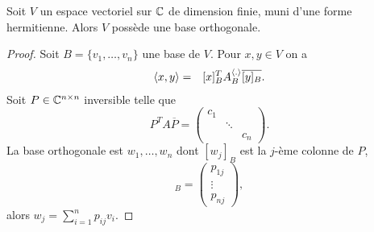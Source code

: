 \begin{theorem}
  \label{thr:11}
  Soit $V$ un espace vectoriel sur $\mathbb{C}$ de dimension finie, muni d'une forme  hermitienne. Alors $V$ possède une base orthogonale. 
\end{theorem}
\begin{proof}
  Soit $B = \{v_1,\dots,v_n\}$  une base de $V$. Pour $x,y \in V$ on a 
  \begin{eqnarray*}
    \langle {x,y} \rangle & = & [x]_B^T A_B^{\langle {.} \rangle} \overline{[y]_B}. 
  \end{eqnarray*}
  Soit $P \in \mathbb{C}^{n\times n} $ inversible telle que
  \begin{displaymath}
    P^T A \overline{P} =
    \begin{pmatrix}
      c_1\\
      & \ddots \\
      && c_n
    \end{pmatrix}. 
  \end{displaymath}
  La base orthogonale est $w_1,\dots,w_n$ dont $ [w_j]_B$ est  la $j$-ème colonne de $P$, 
  \begin{displaymath}
     [w_j]_B =
  \begin{pmatrix}
    p_{1j}\\ \vdots \\ p_{nj}
  \end{pmatrix}, 
  \end{displaymath} 
alors $w_j = \sum_{i=1}^n p_{ij} v_i$. 

\end{proof}




